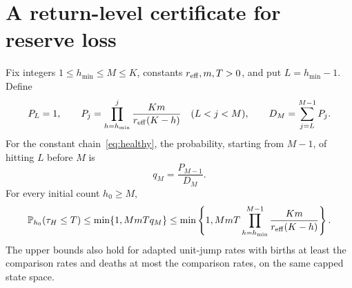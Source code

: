 \section{A return-level certificate for reserve loss}\label{sec:reserve}
\begin{theorem}\label{thm:anchor}
Fix integers $1\le h_{\min}\le M\le K$, constants $r_{\mathrm{eff}},m,T>0$, and put $L=h_{\min}-1$. Define
\begin{equation}\label{eq:scale}
 P_L=1,\qquad
 P_j=\prod_{h=h_{\min}}^j\frac{Km}{r_{\mathrm{eff}}(K-h)}\quad(L<j<M),\qquad
 D_M=\sum_{j=L}^{M-1}P_j.
\end{equation}
For the constant chain~\eqref{eq:healthy}, the probability, starting from $M-1$, of hitting $L$ before $M$ is
\begin{equation}\label{eq:q}
 q_M=\frac{P_{M-1}}{D_M}.
\end{equation}
For every initial count $h_0\ge M$,
\begin{equation}\label{eq:anchorbound}
 \mathbb P_{h_0}(\tau_H\le T)
 \le \min\{1,MmTq_M\}
 \le \min\left\{1,MmT\prod_{h=h_{\min}}^{M-1}
               \frac{Km}{r_{\mathrm{eff}}(K-h)}\right\}.
\end{equation}
The upper bounds also hold for adapted unit-jump rates with births at least the comparison rates and deaths at most the comparison rates, on the same capped state space.
\end{theorem}


